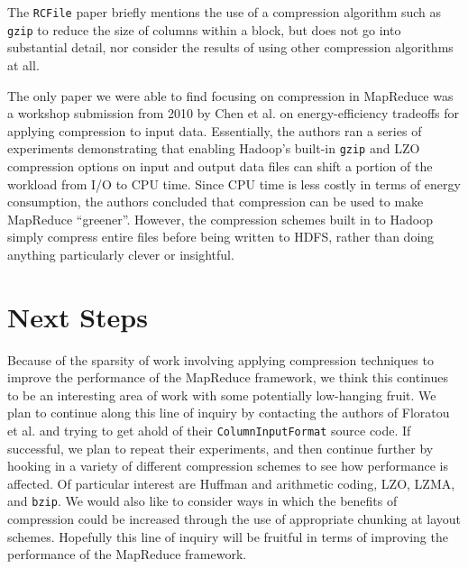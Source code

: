 \documentclass[twocolumn]{article}
\begin{document}
The \verb+RCFile+ paper briefly mentions the use of a compression algorithm
such as \verb+gzip+ to reduce the size of columns within a block, but does
not go into substantial detail, nor consider the results of using other
compression algorithms at all.

The only paper we were able to find focusing on compression in MapReduce
was a workshop submission from 2010 by Chen et al. \cite{ref:energy} on
energy-efficiency tradeoffs for applying compression to input data.
Essentially, the authors ran a series of experiments demonstrating that
enabling Hadoop's built-in \verb+gzip+ and LZO compression options
on input and output data files can shift a portion of the workload
from I/O to CPU time.  Since CPU time is less costly in terms of energy
consumption, the authors concluded that compression can be used to make
MapReduce ``greener''.  However, the compression schemes built in to 
Hadoop simply compress entire files before being written to HDFS, rather
than doing anything particularly clever or insightful.

\section{Next Steps}

Because of the sparsity of work involving applying compression techniques
to improve the performance of the MapReduce framework, we think this continues
to be an interesting area of work with some potentially low-hanging fruit.
We plan to continue along this line of inquiry by contacting the authors
of Floratou et al. and trying to get ahold of their \verb+ColumnInputFormat+
source code.  If successful, we plan to repeat their experiments, and then
continue further by hooking in a variety of different compression schemes
to see how performance is affected.  Of particular interest are Huffman
and arithmetic coding, LZO,
LZMA, and \verb+bzip+.  We would also like to consider ways in which
the benefits of compression could be increased through the use of
appropriate chunking at layout schemes.  Hopefully this line of inquiry
will be fruitful in terms of improving the performance of the MapReduce
framework.
\end{document}
